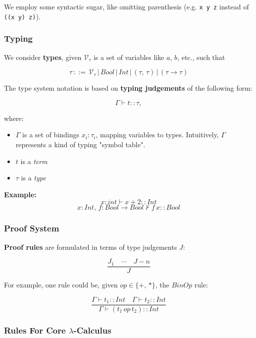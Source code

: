 \documentclass[a4paper]{extarticle}
\begin{document}
We employ some syntactic sugar, like omitting parenthesis (e.g. \verb|x y z| instead of \verb|((x y) z)|).

\subsubsection{Typing}

We consider \textbf{types}, given \(\mathcal{V}_{\tau}\) is a set of variables like \(a\), \(b\), etc., such that

\[
    \tau \, ::= \, \mathcal{V}_{\tau} \, | \, Bool \, | \, Int \, | \, (\tau, \, \tau) \, | \, (\tau \to \tau)
\]

The type system notation is based on \textbf{typing judgements} of the following form:

\[
    \Gamma \vdash t :: \tau,
\]

where:

\begin{itemize}
    \item \(\Gamma\) is a set of bindings \(x_i : \tau_i\), mapping variables to types. Intuitively, \(\Gamma\) represents a kind of typing "symbol table".
    \item \(t\) is a \textit{term}
    \item \(\tau\) is a \textit{type}
\end{itemize}

\begin{ebox}
    \textbf{Example:}
    \[
        x : int \vdash x + 2 :: Int
    \]
    \[
        x : Int, \, f : Bool \to Bool \nvdash f \, x :: Bool        
    \]
\end{ebox}

\subsubsection{Proof System}

\textbf{Proof rules} are formulated in terms of type judgements \(J\):

\[
    \frac{J_1 \quad \cdots \quad J-n}{J}
\]

For example, one rule could be, given \(op \in \{+, \, *\}\), the \(BinOp\) rule:

\[
    \frac{\Gamma \vdash t_1 :: Int \quad \Gamma \vdash t_2 :: Int}{\Gamma \vdash (t_1 \, op \, t_2) :: Int}
\]

\subsubsection{Rules For Core \(\lambda\)-Calculus}
\end{document}
